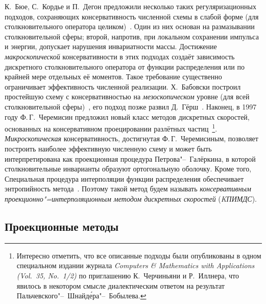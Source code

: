 К.~Бюе, С.~Кордье и П.~Дегон предложили несколько таких регуляризационных подходов,
сохраняющих консервативность численной схемы в слабой форме (для столкновительного оператора целиком)~\cite{Buet1998}.
Один из них основан на размазывании столкновительной сферы;
второй, напротив, при локальном сохранении импульса и энергии, допускает нарушения инвариатности массы.
Достижение \emph{макроскопической} консервативности в этих подходах создаёт зависимость
дискретного столкновительного оператора от функции распределения или по крайней мере отдельных её моментов.
Такое требование существенно ограничивает эффективность численной реализации.
Х.~Бабовски построил простейшую схему с консервативностью на \emph{мезоскопическом} уровне
(для всей столкновительной сферы)~\cite{Babovsky1998}, его подход позже развил Д.~Гёрш~\cite{Goersch2002}.
Наконец, в 1997 году Ф.\,Г.~Черемисин предложил новый класс методов дискретных скоростей,
основанных на консервативном проецировании разлётных частиц~\cite{Tcheremissine1997, Tcheremissine1998}\footnote{
    Интересно отметить, что все описанные подходы были опубликованы в одном специальном издании журнала
    \textit{Computers \& Mathematics with Applications (Vol.~35, No.~1/2)} по приглашению К.~Черчиньяни и Р.~Иллнера,
    что явилось в некотором смысле диалектическим ответом на результат Пальчевского"--~Шнайд\'{е}ра"--~Бобылева.}.
\emph{Микроскопическая} консервативность, достигнутая Ф.\,Г.~Черемисиным, позволяет построить наиболее эффективную
численную схему и может быть интерпретирована как проекционная процедура Петрова"--~Галёркина,
в которой столкновительные инварианты образуют ортогональную оболочку.
Кроме того, Специальная процедура интерполяции функции распределения обеспечивает
энтропийность метода~\cite{Tcheremissine2000}. Поэтому такой метод будем называть
\emph{консервативным проекционно"=интерполяционным методом дискретных скоростей} (\emph{KПИМДС}).

\subsection{Проекционные методы}

